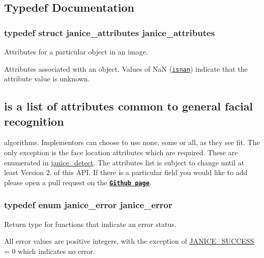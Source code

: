 \subsection{Typedef Documentation}
\hypertarget{group__janice_gaf16b5ce9751b8450f61adb9a957b0fc2}{}
\subsubsection[{janice\+\_\+attributes}]{\setlength{\rightskip}{0pt plus 5cm}typedef struct {\bf janice\+\_\+attributes}  {\bf janice\+\_\+attributes}}\label{group__janice_gaf16b5ce9751b8450f61adb9a957b0fc2}


Attributes for a particular object in an image. 

Attributes associated with an object. Values of {\ttfamily Na\+N} (\href{http://www.cplusplus.com/reference/cmath/isnan/}{\tt isnan}) indicate that the attribute value is unknown.\hypertarget{group__janice_Below}{}\subsection{is a list of attributes common to general facial recognition}\label{group__janice_Below}
algorithms. Implementors can choose to use none, some or all, as they see fit. The only exception is the face location attributes which are required. These are enumerated in \hyperlink{group__janice_ga689c273a241f8e8694468fa561a7184b}{janice\+\_\+detect}. The attributes list is subject to change until at least Version 2. of this A\+P\+I. If there is a particular field you would like to add please open a pull request on the \href{https://github.com/Noblis/janice/pulls}{\tt {\bfseries Github page}}. \hypertarget{group__janice_gac9071fe2c752efef60aa3f932a290fda}{}
\subsubsection[{janice\+\_\+error}]{\setlength{\rightskip}{0pt plus 5cm}typedef enum {\bf janice\+\_\+error}  {\bf janice\+\_\+error}}\label{group__janice_gac9071fe2c752efef60aa3f932a290fda}


Return type for functions that indicate an error status. 

All error values are positive integers, with the exception of \hyperlink{group__janice_gga4873d49c1f9d6a6880dfbd485cf6ba72a7cd6c7d28583c2dfa4e19f8642a60f3e}{J\+A\+N\+I\+C\+E\+\_\+\+S\+U\+C\+C\+E\+S\+S} = 0 which indicates no error. \hypertarget{group__janice_ga08feff1c2835b44332afeda80c3d0fb7}{}
